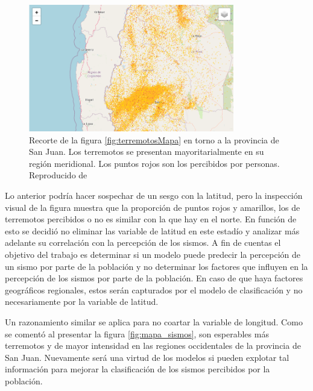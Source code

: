 \documentclass[a4paper]{report}
\begin{document}
\begin{figure}[!ht]
	\centering
	\includegraphics[width=0.8\textwidth]{sanJuan.png}
	\caption{Recorte de la figura \ref{fig:terremotosMapa} en torno a la provincia de San Juan.
	Los terremotos se presentan mayoritarialmente en su región meridional.
	Los puntos rojos son los percibidos por personas.
	Reproducido de \cite{daniela_parada_ic-datasets-docencia_nodate}}
\label{fig:sanJuan}
\end{figure}

Lo anterior podría hacer sospechar de un sesgo con la latitud, pero la inspección visual de la figura muestra que la proporción de puntos rojos y amarillos, los de terremotos percibidos o no es similar con la que hay en el norte.
En función de esto se decidió no eliminar las variable de latitud en este estadío y analizar más adelante su correlación con la percepción de los sismos.
A fin de cuentas el objetivo del trabajo es determinar si un modelo puede predecir la percepción de un sismo por parte de la población y no determinar los factores que influyen en la percepción de los sismos por parte de la población.
En caso de que haya factores geográficos regionales, estos serán capturados por el modelo de clasificación y no necesariamente por la variable de latitud.

Un razonamiento similar se aplica para no coartar la variable de longitud.
Como se comentó al presentar la figura \ref{fig:mapa_sismos}, son esperables más terremotos y de mayor intensidad en las regiones occidentales de la provincia de San Juan.
Nuevamente será una virtud de los modelos si pueden explotar tal información para mejorar la clasificación de los sismos percibidos por la población.

\end{document}
